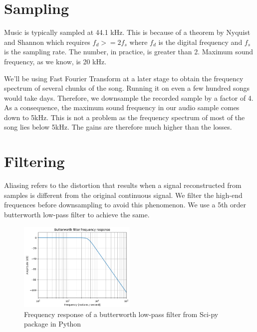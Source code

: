 \documentclass[12pt, a4paper]{IEEEtran}
\begin{document}
\section{Sampling}
Music is typically sampled at 44.1 kHz. This is because of a theorem by Nyquist and Shannon which requires \(f_d >= 2f_s\) where \(f_d\) is the digital frequency and \(f_s\) is the sampling rate. The number, in practice, is greater than 2. Maximum sound frequency, as we know, is 20 kHz.
\par
We'll be using Fast Fourier Transform at a later stage to obtain the frequency spectrum of several chunks of the song. Running it on even a few hundred songs would take days.
Therefore, we downsample the recorded sample by a factor of 4. 
As a consequence, the maximum sound frequency in our audio sample comes down to 5kHz. This is not a problem as the frequency spectrum of most of the song lies below 5kHz. The gains are therefore much higher than the losses.

\section{Filtering}
Aliasing refers to the distortion that results when a signal reconstructed from samples is different from the original continuous signal.
We filter the high-end frequences before downsampling to avoid this phenomenon. We use a 5th order butterworth low-pass filter to achieve the same.
\begin{figure}[h]
    \includegraphics[width=0.5\textwidth]{lowpassfilter.png}
    \captionsetup{justification=centering}
    \caption{Frequency response of a butterworth low-pass filter from Sci-py package in Python}
\end{figure}
\end{document}
